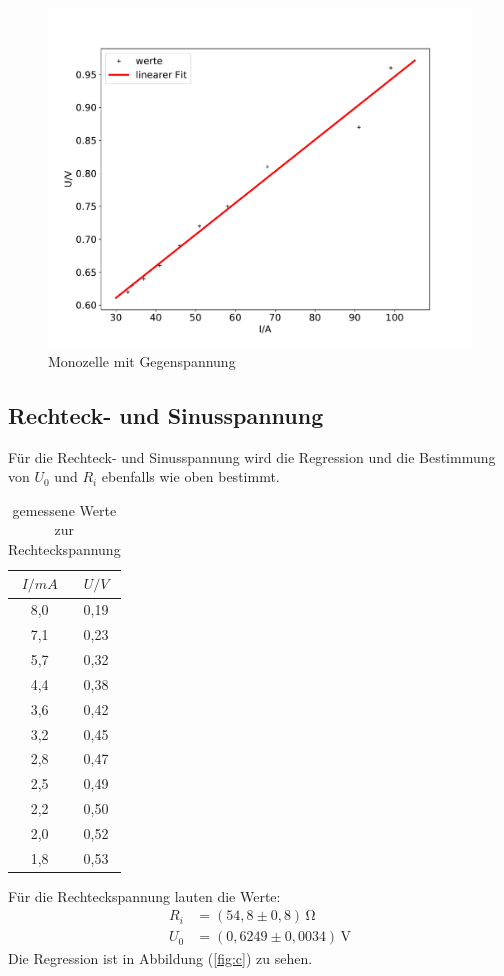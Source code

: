 \begin{figure}[H]
  \centering
  \includegraphics[width=\textwidth]{plotb.pdf}
  \caption{Monozelle mit Gegenspannung}
  \label{fig:Messungb}
\end{figure}

\subsection{Rechteck- und Sinusspannung}
Für die Rechteck- und Sinusspannung wird die Regression
und die Bestimmung von $U_0$ und $R_i$ ebenfalls wie oben bestimmt.
\begin{table}
  \centering
  \caption{gemessene Werte zur Rechteckspannung}
  \label{tab:3}
  \begin{tabular}{c c}
    \toprule $I/mA$ & $U/V$  \\
    \midrule
    8,0 & 0,19\\
    7,1 & 0,23\\
    5,7 & 0,32\\
    4,4 & 0,38\\
    3,6 & 0,42\\
    3,2 & 0,45\\
    2,8 & 0,47\\
    2,5 & 0,49\\
    2,2 & 0,50\\
    2,0 & 0,52\\
    1,8 & 0,53\\
    \bottomrule
  \end{tabular}
\end{table}
Für die Rechteckspannung lauten die Werte:
\begin{align*}
  R_i &= (54,8 \pm 0,8)\, \mathrm{\Omega}\\
  U_0 &= (0,6249 \pm 0,0034)\, \mathrm{V}
\end{align*}
Die Regression ist in Abbildung (\ref{fig:c}) zu sehen.

